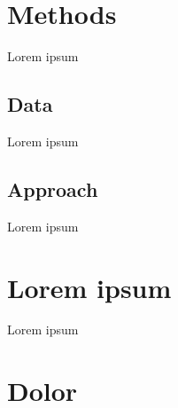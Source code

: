 \documentclass[12pt]{report}
\begin{document}
\chapter{Methods}
Lorem ipsum

\section{Data}
Lorem ipsum

\section{Approach}
Lorem ipsum



\appendix
\chapter{Lorem ipsum}
Lorem ipsum

\chapter{Dolor}
\end{document}
